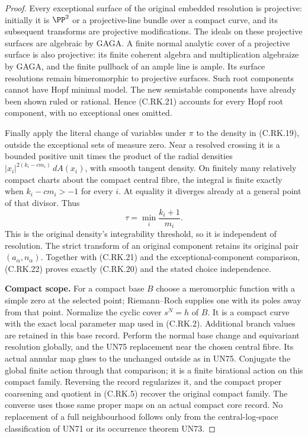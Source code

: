 \begin{proof}
Every exceptional surface of
the original embedded resolution
is projective: initially it is
$\PP^2$ or a projective-line
bundle over a compact curve,
and its subsequent transforms
are projective modifications.
The ideals on these projective
surfaces are algebraic by GAGA.
A finite normal analytic cover
of a projective surface is also
projective: its finite coherent
algebra and multiplication
algebraize by GAGA, and the
finite pullback of an ample
line is ample. Its surface
resolutions remain bimeromorphic
to projective surfaces. Such
root components cannot have
Hopf minimal model. The new
semistable components have
already been shown ruled or
rational. Hence (C.RK.21)
accounts for every Hopf root
component, with no exceptional
ones omitted.

Finally apply the literal change
of variables under $\pi$ to the
density in (C.RK.19), outside
the exceptional sets of measure
zero. Near a resolved crossing
it is a bounded positive unit
times the product of the radial
densities
$|x_i|^{2(k_i-cm_i)}\,dA(x_i)$,
with smooth tangent density.
On finitely many relatively
compact charts about the compact
central fibre, the integral is
finite exactly when
$k_i-cm_i>-1$ for every $i$.
At equality it diverges already
at a general point of that
divisor. Thus
\[
                             \tau=\min_i\frac{k_i+1}{m_i}.
\tag{C.RK.22}
\]
This is the original density's
integrability threshold, so it
is independent of resolution.
The strict transform of an
original component retains
its original pair
$(a_\alpha,n_\alpha)$.
Together with (C.RK.21) and the
exceptional-component comparison,
(C.RK.22) proves exactly
(C.RK.20) and the stated
choice independence.

\par\medskip\noindent\textbf{Compact scope.}
For a compact base $B$ choose
a meromorphic function with
a simple zero at the selected
point; Riemann--Roch supplies
one with its poles away from
that point. Normalize the
cyclic cover $s^N=h$ of $B$.
It is a compact curve with
the exact local parameter
map used in (C.RK.2).
Additional branch values
are retained in this base
record. Perform the normal
base change and equivariant
resolution globally, and
the UN75 replacement near
the chosen central fibre.
Its actual annular map
glues to the unchanged
outside as in UN75. Conjugate
the global finite action
through that comparison;
it is a finite birational
action on this compact
family. Reversing the
record regularizes it,
and the compact proper
coarsening and quotient
in (C.RK.5) recover the
original compact family.
The converse uses those
same proper maps on an
actual compact core record.
No replacement of a full
neighbourhood follows only
from the central-log-space
classification of UN71
or its occurrence theorem
UN73.
\end{proof}
